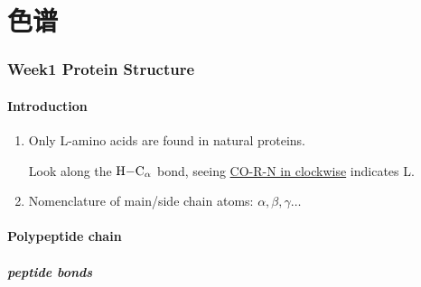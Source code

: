 \chapter{色谱}





\hypertarget{week1-protein-structure}{%
	\subsection{Week1 Protein Structure}\label{week1-protein-structure}}

\hypertarget{introduction}{%
	\subsubsection{Introduction}\label{introduction}}

\begin{enumerate}
	\def\labelenumi{\arabic{enumi}.}
	\item
	Only L-amino acids are found in natural proteins.
	
	Look along the \(\ce{H-C_\alpha}\) bond, seeing \underline{CO-R-N in
		clockwise} indicates L.
	\item
	Nomenclature of main/side chain atoms: \(\alpha, \beta, \gamma\dots\)
\end{enumerate}

\hypertarget{polypeptide-chain}{%
	\subsubsection{Polypeptide chain}\label{polypeptide-chain}}

\hypertarget{peptide-bonds}{%
	\paragraph{peptide bonds}\label{peptide-bonds}}

